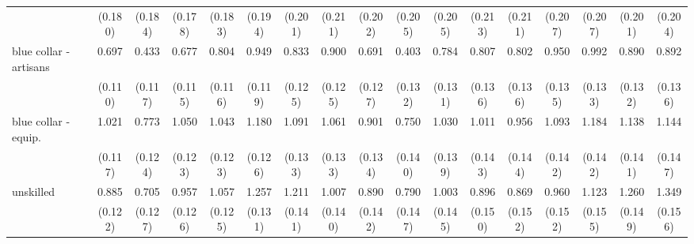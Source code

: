 {\begin{tabular}{l*{16}{c}}
                    &     (0.180)         &     (0.184)         &     (0.178)         &     (0.183)         &     (0.194)         &     (0.201)         &     (0.211)         &     (0.202)         &     (0.205)         &     (0.205)         &     (0.213)         &     (0.211)         &     (0.207)         &     (0.207)         &     (0.201)         &     (0.204)         \\
[1em]
blue collar - artisans&       0.697\sym{***}&       0.433\sym{***}&       0.677\sym{***}&       0.804\sym{***}&       0.949\sym{***}&       0.833\sym{***}&       0.900\sym{***}&       0.691\sym{***}&       0.403\sym{**} &       0.784\sym{***}&       0.807\sym{***}&       0.802\sym{***}&       0.950\sym{***}&       0.992\sym{***}&       0.890\sym{***}&       0.892\sym{***}\\
                    &     (0.110)         &     (0.117)         &     (0.115)         &     (0.116)         &     (0.119)         &     (0.125)         &     (0.125)         &     (0.127)         &     (0.132)         &     (0.131)         &     (0.136)         &     (0.136)         &     (0.135)         &     (0.133)         &     (0.132)         &     (0.136)         \\
[1em]
blue collar - equip.&       1.021\sym{***}&       0.773\sym{***}&       1.050\sym{***}&       1.043\sym{***}&       1.180\sym{***}&       1.091\sym{***}&       1.061\sym{***}&       0.901\sym{***}&       0.750\sym{***}&       1.030\sym{***}&       1.011\sym{***}&       0.956\sym{***}&       1.093\sym{***}&       1.184\sym{***}&       1.138\sym{***}&       1.144\sym{***}\\
                    &     (0.117)         &     (0.124)         &     (0.123)         &     (0.123)         &     (0.126)         &     (0.133)         &     (0.133)         &     (0.134)         &     (0.140)         &     (0.139)         &     (0.143)         &     (0.144)         &     (0.142)         &     (0.142)         &     (0.141)         &     (0.147)         \\
[1em]
unskilled           &       0.885\sym{***}&       0.705\sym{***}&       0.957\sym{***}&       1.057\sym{***}&       1.257\sym{***}&       1.211\sym{***}&       1.007\sym{***}&       0.890\sym{***}&       0.790\sym{***}&       1.003\sym{***}&       0.896\sym{***}&       0.869\sym{***}&       0.960\sym{***}&       1.123\sym{***}&       1.260\sym{***}&       1.349\sym{***}\\
                    &     (0.122)         &     (0.127)         &     (0.126)         &     (0.125)         &     (0.131)         &     (0.141)         &     (0.140)         &     (0.142)         &     (0.147)         &     (0.145)         &     (0.150)         &     (0.152)         &     (0.152)         &     (0.155)         &     (0.149)         &     (0.156)         \\

\end{tabular}}
